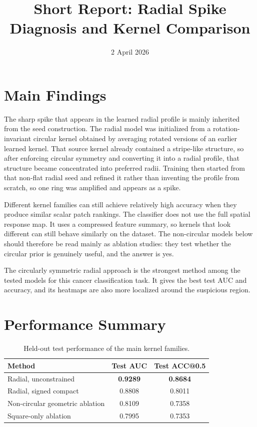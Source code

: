 \documentclass{article}
\begin{document}
\title{Short Report: Radial Spike Diagnosis and Kernel Comparison}
\author{}
\date{2 April 2026}
\maketitle
\footnotesize
\setlength{\parindent}{0pt}
\setlength{\parskip}{0.35em}

\section*{Main Findings}

The sharp spike that appears in the learned radial profile is mainly inherited from the seed construction. The radial model was initialized from a rotation-invariant circular kernel obtained by averaging rotated versions of an earlier learned kernel. That source kernel already contained a stripe-like structure, so after enforcing circular symmetry and converting it into a radial profile, that structure became concentrated into preferred radii. Training then started from that non-flat radial seed and refined it rather than inventing the profile from scratch, so one ring was amplified and appears as a spike.

Different kernel families can still achieve relatively high accuracy when they produce similar scalar patch rankings. The classifier does not use the full spatial response map. It uses a compressed feature summary, so kernels that look different can still behave similarly on the dataset. The non-circular models below should therefore be read mainly as ablation studies: they test whether the circular prior is genuinely useful, and the answer is yes.

The circularly symmetric radial approach is the strongest method among the tested models for this cancer classification task. It gives the best test AUC and accuracy, and its heatmaps are also more localized around the suspicious region.


\section*{Performance Summary}

\begin{table}[H]
\centering
\begin{tabular}{lcc}
\toprule
Method & Test AUC & Test ACC@0.5 \\
\midrule
Radial, unconstrained & \textbf{0.9289} & \textbf{0.8684} \\
Radial, signed compact & 0.8808 & 0.8011 \\
Non-circular geometric ablation & 0.8109 & 0.7358 \\
Square-only ablation & 0.7995 & 0.7353 \\
\bottomrule
\end{tabular}
\caption{Held-out test performance of the main kernel families.}
\end{table}
\end{document}
